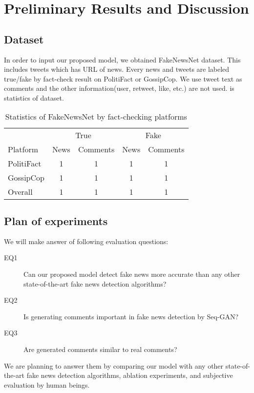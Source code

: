 \section{Preliminary Results and Discussion}
\subsection{Dataset}
In order to input our proposed model, we obtained FakeNewsNet\cite{shu2017exploiting,shu2017fake,shu2018fakenewsnet} dataset.
This includes tweets which has URL of news.
Every news and tweets are labeled true/fake by fact-check result on PolitiFact or GossipCop.
We use tweet text as comments and the other information(user, retweet, like, etc.) are not used.
 is statistics of dataset.

\begin{table}[htp]
    \centering
    \caption{Statistics of FakeNewsNet by fact-checking platforms}
    \label{table:fakenewsnet}
    \begin{tabular}{lcccc}
        \hline 
        & \multicolumn{2}{c}{True} & \multicolumn{2}{c}{Fake} \\
        Platform & News & Comments & News & Comments \\
        \hline \hline 
        PolitiFact & 1 & 1 & 1 & 1 \\
        GossipCop & 1 & 1 & 1 & 1 \\
        \hline 
        Overall & 1 & 1 & 1 & 1 \\
        \hline 
    \end{tabular}
\end{table}

\subsection{Plan of experiments}
We will make answer of following evaluation questions:
\begin{description}
    \item[EQ1] Can our proposed model detect fake news more accurate than any other state-of-the-art fake news detection algorithms?
    \item[EQ2] Is generating comments important in fake news detection by Seq-GAN?
    \item[EQ3] Are generated comments similar to real comments?
\end{description}

We are planning to answer them by comparing our model with any other state-of-the-art fake news detection algorithms,
ablation experiments, and subjective evaluation by human beings.

